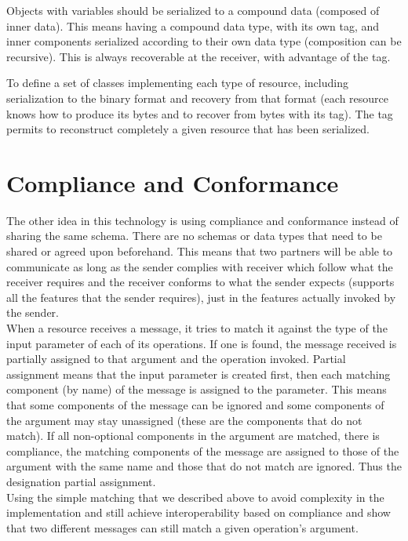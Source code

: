 Objects with variables should be serialized to a compound data (composed of inner data). This means having a compound
data type, with its own tag, and inner components serialized according to their own data type (composition can be
recursive). This is always recoverable at the receiver, with advantage of the tag.

To define a set of classes implementing each type of resource, including serialization to the binary format and recovery
from that format (each resource knows how to produce its bytes and to recover from bytes with its tag). The tag permits to
reconstruct completely a given resource that has been serialized.



\section{Compliance and Conformance}
\label{section:Compliance}

The other idea in this technology is using compliance and conformance instead of sharing the same schema. There are no
schemas or data types that need to be shared or agreed upon beforehand. This means that two partners will be able to
communicate as long as the sender complies with receiver which follow what the receiver requires and the receiver conforms to
what the sender expects (supports all the features that the sender requires), just in the features actually invoked by the
sender.\\

When a resource receives a message, it tries to match it against the type of the input parameter of each of its operations.
If one is found, the message received is partially assigned to that argument and the operation invoked. Partial assignment
means that the input parameter is created first, then each matching component (by name) of the message is assigned to the
parameter. This means that some components of the message can be ignored and some components of the argument may stay
unassigned (these are the components that do not match). If all non-optional components in the argument are matched,
there is compliance, the matching components of the message are assigned to those of the argument with the same name and
those that do not match are ignored. Thus the designation partial assignment.\\

Using the simple matching that we described above to avoid complexity in the implementation and  still achieve
interoperability based on compliance and show that two different messages can still match a given operation's argument.

